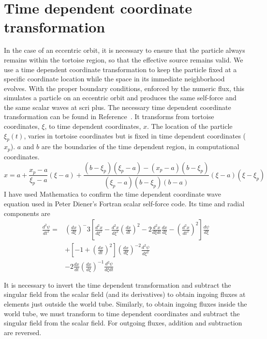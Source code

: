 \section{Time dependent coordinate transformation}

In the case of an eccentric orbit, it is necessary to ensure that the particle always remains within the tortoise region, so that the effective source remains valid. We use a time dependent coordinate transformation to keep the particle fixed at a specific coordinate location while the space in its immediate neighborhood evolves. With the proper boundary conditions, enforced by the numeric flux, this simulates a particle on an eccentric orbit and produces the same self-force and the same scalar waves at scri plus. The necessary time dependent coordinate transformation can be found in Reference~\cite{time_dependent_coordinate_transformation}. It transforms from tortoise coordinates, $\xi$, to time dependent coordinates, $x$. The location of the particle $\xi_p(t)$, varies in tortoise coordinates but is fixed in time dependent coordinates ($x_p$). $a$ and $b$ are the boundaries of the time dependent region, in computational coordinates. 
\begin{equation}
  x=a+\frac{x_p-a}{\xi_p-a}(\xi-a)+\frac{(b-\xi_p)(\xi_p-a)-(x_p-a)(b-\xi_p)}{(\xi_p-a)(b-\xi_p)(b-a)}(\xi-a)(\xi-\xi_p)
\end{equation}
I have used Mathematica to confirm the time dependent coordinate wave equation used in Peter Diener's Fortran scalar self-force code. Its time and radial components are
\begin{eqnarray}
\frac{d^2\psi}{dt^2}=&(\frac{dx}{d\xi})^-3[\frac{d^2x}{d\xi^2}-\frac{d^2x}{d\xi^2}(\frac{dx}{dt})^2-2\frac{d^2x}{d\xi dt}\frac{dx}{d\xi}-(\frac{d^2x}{dt^2})^2]\frac{d\psi}{d\xi}\nonumber\\
&+[-1+(\frac{dx}{dt})^2](\frac{dx}{d\xi})^{-2}\frac{d^2\psi}{d\xi^2}\nonumber\\
&-2\frac{dx}{dt}(\frac{dx}{d\xi})^{-1}\frac{d^2\psi}{d\xi dt}
\end{eqnarray}

It is necessary to invert the time dependent transformation and subtract the singular field from the scalar field (and its derivatives) to obtain ingoing fluxes at elements just outside the world tube. Similarly, to obtain ingoing fluxes inside the world tube, we must transform to time dependent coordinates and subtract the singular field from the scalar field. For outgoing fluxes, addition and subtraction are reversed. 


